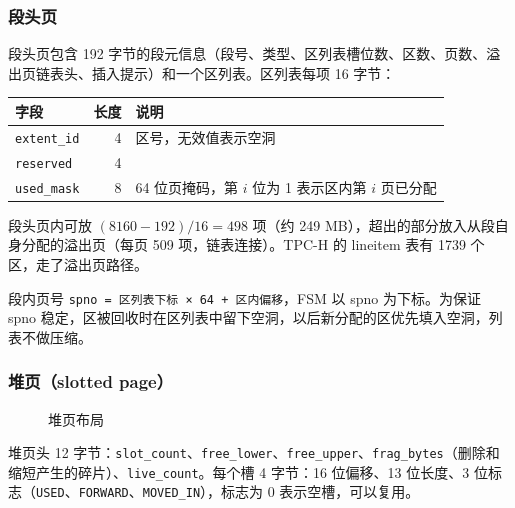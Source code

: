 \documentclass[11pt,a4paper]{ctexart}
\newcommand{\code}[1]{\texttt{#1}}
\begin{document}
\subsubsection{段头页}

段头页包含 192 字节的段元信息（段号、类型、区列表槽位数、区数、页数、溢出页链表头、插入提示）和一个区列表。区列表每项 16 字节：

\begin{center}
  \begin{tabular}{l r l}
    \toprule
    字段 & 长度 & 说明 \\
    \midrule
    \code{extent\_id} & 4 & 区号，无效值表示空洞 \\
    \code{reserved} & 4 & \\
    \code{used\_mask} & 8 & 64 位页掩码，第 $i$ 位为 1 表示区内第 $i$ 页已分配 \\
    \bottomrule
  \end{tabular}
\end{center}

段头页内可放 $(8160-192)/16 = 498$ 项（约 249 MB），超出的部分放入从段自身分配的溢出页（每页 509 项，链表连接）。TPC-H 的 lineitem 表有 1739 个区，走了溢出页路径。

段内页号 \code{spno = 区列表下标 × 64 + 区内偏移}，FSM 以 spno 为下标。为保证 spno 稳定，区被回收时在区列表中留下空洞，以后新分配的区优先填入空洞，列表不做压缩。

\subsubsection{堆页（slotted page）}

\begin{figure}[H]
  \centering
  \caption{堆页布局}
\end{figure}

堆页头 12 字节：\code{slot\_count}、\code{free\_lower}、\code{free\_upper}、\code{frag\_bytes}（删除和缩短产生的碎片）、\code{live\_count}。每个槽 4 字节：16 位偏移、13 位长度、3 位标志（\code{USED}、\code{FORWARD}、\code{MOVED\_IN}），标志为 0 表示空槽，可以复用。
\end{document}
